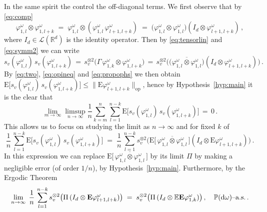 \documentclass[a4paper,reqno,11pt]{amsart}
\numberwithin{equation}{section}
\newcommand{\bbE}{{\ensuremath{\mathbb E}} }
\newcommand{\bbP}{{\ensuremath{\mathbb P}} }
\newcommand{\cL}{{\ensuremath{\mathcal L}} }
\newcommand{\gp}{\varphi}
\newcommand{\go}{\omega}
\newcommand{\dd}{\text{\rm d}}             %
\newcommand{\R}{\mathbb{R}}
\def\bE{\ensuremath{\bs{\mathrm{E}}}}
\def\bs{\boldsymbol}
\begin{document}
In the same spirit the control the off-diagonal terms. We first observe that
by \eqref{eq:comp}
\begin{equation}
	\varphi_{1,l}^\omega \otimes \varphi^\omega_{1,l+k}
	\;=\; \varphi_{1,l}^\omega \otimes ( \varphi^\omega_{1,l} \, \varphi^\omega_{l+1,l+k} )
	\;=\; \big( \varphi_{1,l}^\omega \otimes \varphi^\omega_{1,l} \big)
	(I_d \otimes \varphi^\omega_{l+1,l+k}) \,,
\end{equation}
where $I_d \in \cL(\R^d)$ is the identity operator. Then
by \eqref{eq:tensorlin} and \eqref{eq:symm2} we can write
\begin{equation}
	s_{v}( \gp_{1,l}^\go) \, s_{v}( \gp_{1,l+k}^\go)
	\,=\, s_v^{\otimes 2} \big( \Gamma \, \gp_{1,k}^\go \otimes \gp_{1,l+k}^\go \big)
	\,=\, s_v^{\otimes 2} \big( \big(
	\overline{\varphi_{1,l}^\omega \otimes \varphi^\omega_{1,l}} \big)
	(I_d \otimes \varphi^\omega_{l+1,l+k}) \big) \,.
\end{equation}
By \eqref{eq:two}, \eqref{eq:opineq} and \eqref{eq:propophs} we then obtain
$\bE \big[ s_{v}( \gp_{1,l}^\go) \, s_{v}( \gp_{1,l+k}^\go) \big]
\le \big\| \bE \varphi^\omega_{l+1,l+k} \big\|_{\text{op}}$,
hence by Hypothesis~\ref{hyp:main} it is the clear that
 \begin{equation}
 \label{eq:off-d1}
 \lim_{m \to \infty} \limsup_{n \to \infty}
 \frac 1n
 \sum_{k=m}^n
\sum_{l=1}^{n-k} \bE \big[ s_{v}( \gp_{1,l}^\go) \, s_{v}( \gp_{1,l+k}^\go) \big] \, =\, 0 \,.
 \end{equation}
This allows us to focus on studying the limit as $n \to \infty$ and for fixed $k$ of
\begin{equation}
\label{eq:withH}
	\frac 1n \, \sum_{l=1}^{n-k} \bE \big[ s_{v}( \gp_{1,l}^\go) \, s_{v}( \gp_{1,l+k}^\go) \big]
	\;=\; \frac 1n \, \sum_{l=1}^{n-k} s_v^{\otimes 2}
	\big( \bE \big[ \, \overline{\varphi_{1,l}^\omega \otimes \varphi^\omega_{1,l}} \, \big]
	(I_d \otimes \bE \varphi^\omega_{l+1,l+k} ) \big)  \,.
\end{equation}
In this expression we can replace
$\bE \big[\, \overline{\varphi_{1,l}^\omega \otimes \varphi^\omega_{1,l}}\, \big]$
by its limit $\Pi$ by making a negligible error (of order $1/n$),
by Hypothesis~\ref{hyp:main}. Furthermore, by the Ergodic Theorem
\begin{equation}
\label{eq:witherg}
\lim_{n \to \infty} \;
\frac {1} n  \,
\sum_{l=1}^{n-k}  s_v^{\otimes 2} \big( \Pi \,
(I_d \otimes \bE \varphi^\omega_{l+1,l+k} ) \big) \; =\;
s_v^{\otimes 2} \big( \Pi \, (I_d \otimes \bbE  \bE \varphi^\omega_{1,k})  \big) \,,
\quad \text{$\bbP(\dd \go)$--a.s.}\,.
\end{equation}
\end{document}
